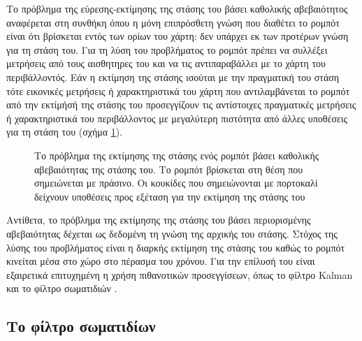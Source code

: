 Το πρόβλημα της εύρεσης-εκτίμησης της στάσης του βάσει καθολικής αβεβαιότητος
αναφέρεται στη συνθήκη όπου η μόνη επιπρόσθετη γνώση που διαθέτει το ρομπότ
είναι ότι βρίσκεται εντός των ορίων του χάρτη: δεν υπάρχει εκ των προτέρων
γνώση για τη στάση του. Για τη λύση του προβλήματος το ρομπότ πρέπει να
συλλέξει μετρήσεις από τους αισθητηρες του και να τις αντιπαραβάλλει με το
χάρτη του περιβάλλοντός. Εάν η εκτίμηση της στάσης ισούται με την πραγματική
του στάση τότε εικονικές μετρήσεις ή χαρακτηριστικά του χάρτη που
αντιλαμβάνεται το ρομπότ από την εκτίμήσή της στάσης του προσεγγίζουν τις
αντίστοιχες πραγματικές μετρήσεις ή χαρακτηριστικά του περιβάλλοντος με
μεγαλύτερη πιστότητα από άλλες υποθέσεις για τη στάση του (σχήμα
\ref{fig:global_localisation}).

\begin{figure}[htbp]\centering
  
  \caption{\small Το πρόβλημα της εκτίμησης της στάσης ενός ρομπότ βάσει καθολικής
           αβεβαιότητας της στάσης του. Το ρομπότ βρίσκεται στη θέση που
           σημειώνεται με πράσινο. Οι κουκίδες που σημειώνονται με πορτοκαλί
           δείχνουν υποθέσεις προς εξέταση για την εκτίμηση της στάσης του}
  \label{fig:global_localisation}
\end{figure}

Αντίθετα, το πρόβλημα της εκτίμησης της στάσης του βάσει περιορισμένης
αβεβαιότητας δέχεται ως δεδομένη τη γνώση της αρχικής του στάσης. Στόχος της
λύσης του προβλήματος είναι η διαρκής εκτίμηση της στάσης του καθώς το ρομπότ
κινείται μέσα στο χώρο στο πέρασμα του χρόνου. Για την επίλυσή του είναι
εξαιρετικά επιτυχημένη η χρήση πιθανοτικών προσεγγίσεων, όπως το φίλτρο Kalman
\cite{Maybeck1979} και το φίλτρο σωματιδιών \cite{Thrun2002a,Gustafsson2002}.

\subsection{Το φίλτρο σωματιδίων}

